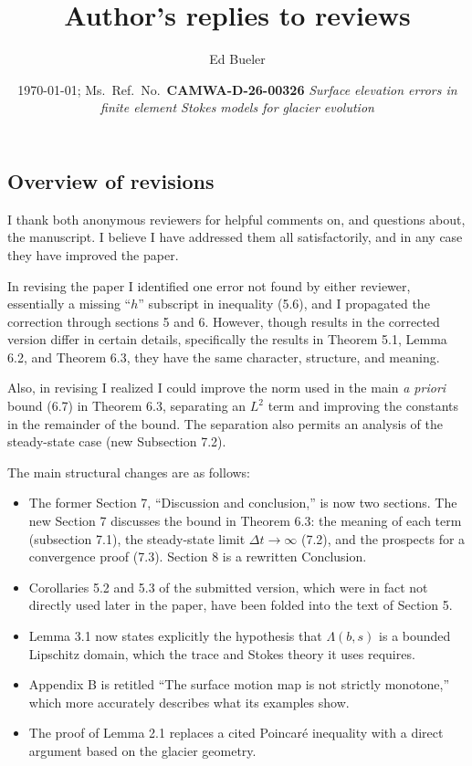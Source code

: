 \documentclass[11pt,reqno]{amsart}
\title{Author's replies to reviews}
\author{Ed Bueler}
\date{\today; Ms.~Ref.~No.~\textbf{CAMWA-D-26-00326} \emph{Surface elevation errors in finite element Stokes models for glacier evolution}}
\begin{document}
\maketitle

\thispagestyle{empty}


\subsection*{Overview of revisions}  I thank both anonymous reviewers for helpful comments on, and questions about, the manuscript.  I believe I have addressed them all satisfactorily, and in any case they have improved the paper.

In revising the paper I identified one error not found by either reviewer, essentially a missing ``$h$'' subscript in inequality (5.6), and I propagated the correction through sections 5 and 6.  However, though results in the corrected version differ in certain details, specifically the results in Theorem 5.1, Lemma 6.2, and Theorem 6.3, they have the same character, structure, and meaning.

Also, in revising I realized I could improve the norm used in the main \emph{a priori} bound (6.7) in Theorem 6.3, separating an $L^2$ term and improving the constants in the remainder of the bound.  The separation also permits an analysis of the steady-state case (new Subsection 7.2).

The main structural changes are as follows:
\begin{itemize}
\item The former Section 7, ``Discussion and conclusion,'' is now two sections.  The new Section 7 discusses the bound in Theorem 6.3: the meaning of each term (subsection 7.1), the steady-state limit $\Delta t\to\infty$ (7.2), and the prospects for a convergence proof (7.3).  Section 8 is a rewritten Conclusion.
\item Corollaries 5.2 and 5.3 of the submitted version, which were in fact not directly used later in the paper, have been folded into the text of Section 5.
\item Lemma 3.1 now states explicitly the hypothesis that $\Lambda(b,s)$ is a bounded Lipschitz domain, which the trace and Stokes theory it uses requires.
\item Appendix B is retitled ``The surface motion map is not strictly monotone,'' which more accurately describes what its examples show.
\item The proof of Lemma 2.1 replaces a cited Poincar\'e inequality with a direct argument based on the glacier geometry.
\end{itemize}
\end{document}
